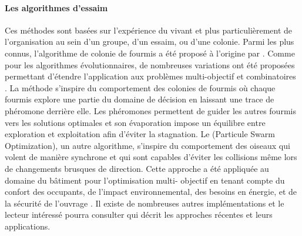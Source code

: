 \paragraph{Les algorithmes d’essaim} %
\label{par:les_algorithmes_d_essaim}
Ces méthodes sont basées sur l’expérience du vivant et plus particulièrement de
l’organisation au sein d’un groupe, d’un essaim, ou d’une colonie. Parmi les plus connus,
l’algorithme de colonie de fourmis a été proposé à l’origine par \textcite{Colorni1992509}.
Comme pour les algorithmes évolutionnaires, de nombreuses variations ont été proposées
permettant d’étendre l’application aux problèmes multi-objectif et combinatoires
\parencite{MichaelGuntsch2003,Shea2006627}.
La méthode s’inspire du comportement des colonies de fourmis où chaque fourmis
explore une partie du domaine de décision en laissant une trace de phéromone
derrière elle. Les phéromones permettent de guider les autres fourmis vers les
solutions optimales et son évaporation impose un équilibre entre exploration et
exploitation afin d’éviter la stagnation.
Le  (Particule Swarm Optimization), un autre algorithme, s’inspire du
comportement des oiseaux qui volent de manière synchrone et qui sont capables
d’éviter les collisions même lors de changements brusques de direction. Cette
approche a été appliquée au domaine du bâtiment pour l’optimisation multi-
objectif en tenant compte du confort des occupants, de l’impact environnemental,
des besoins en énergie, et de la sécurité de l’ouvrage \parencite{Armand-Decker2015}.
Il existe de nombreuses autres implémentations et le lecteur intéressé pourra
consulter \textcite{Aboul-EllaHassanien2015} qui décrit les approches récentes et
leurs applications.


